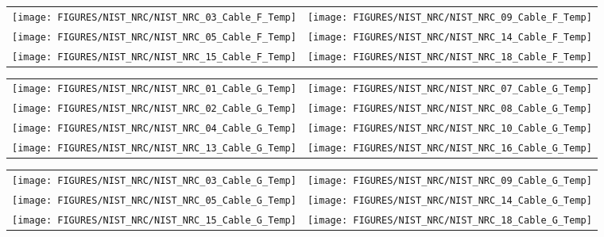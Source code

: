 \begin{figure}[p]
\begin{tabular*}{\textwidth}{l@{\extracolsep{\fill}}r}
\texttt{[image: FIGURES/NIST\_NRC/NIST\_NRC\_03\_Cable\_F\_Temp]} &
\texttt{[image: FIGURES/NIST\_NRC/NIST\_NRC\_09\_Cable\_F\_Temp]} \\
\texttt{[image: FIGURES/NIST\_NRC/NIST\_NRC\_05\_Cable\_F\_Temp]} &
\texttt{[image: FIGURES/NIST\_NRC/NIST\_NRC\_14\_Cable\_F\_Temp]} \\
\texttt{[image: FIGURES/NIST\_NRC/NIST\_NRC\_15\_Cable\_F\_Temp]} &
\texttt{[image: FIGURES/NIST\_NRC/NIST\_NRC\_18\_Cable\_F\_Temp]}
\end{tabular*}
\label{NIST_NRC_Cable_F_Open}
\end{figure}

\begin{figure}[p]
\begin{tabular*}{\textwidth}{l@{\extracolsep{\fill}}r}
\texttt{[image: FIGURES/NIST\_NRC/NIST\_NRC\_01\_Cable\_G\_Temp]} &
\texttt{[image: FIGURES/NIST\_NRC/NIST\_NRC\_07\_Cable\_G\_Temp]} \\
\texttt{[image: FIGURES/NIST\_NRC/NIST\_NRC\_02\_Cable\_G\_Temp]} &
\texttt{[image: FIGURES/NIST\_NRC/NIST\_NRC\_08\_Cable\_G\_Temp]} \\
\texttt{[image: FIGURES/NIST\_NRC/NIST\_NRC\_04\_Cable\_G\_Temp]} &
\texttt{[image: FIGURES/NIST\_NRC/NIST\_NRC\_10\_Cable\_G\_Temp]} \\
\texttt{[image: FIGURES/NIST\_NRC/NIST\_NRC\_13\_Cable\_G\_Temp]} &
\texttt{[image: FIGURES/NIST\_NRC/NIST\_NRC\_16\_Cable\_G\_Temp]}
\end{tabular*}
\label{NIST_NRC_Cable_G_Closed}
\end{figure}

\begin{figure}[p]
\begin{tabular*}{\textwidth}{l@{\extracolsep{\fill}}r}
\texttt{[image: FIGURES/NIST\_NRC/NIST\_NRC\_03\_Cable\_G\_Temp]} &
\texttt{[image: FIGURES/NIST\_NRC/NIST\_NRC\_09\_Cable\_G\_Temp]} \\
\texttt{[image: FIGURES/NIST\_NRC/NIST\_NRC\_05\_Cable\_G\_Temp]} &
\texttt{[image: FIGURES/NIST\_NRC/NIST\_NRC\_14\_Cable\_G\_Temp]} \\
\texttt{[image: FIGURES/NIST\_NRC/NIST\_NRC\_15\_Cable\_G\_Temp]} &
\texttt{[image: FIGURES/NIST\_NRC/NIST\_NRC\_18\_Cable\_G\_Temp]}
\end{tabular*}
\label{NIST_NRC_Cable_G_Open}
\end{figure}

